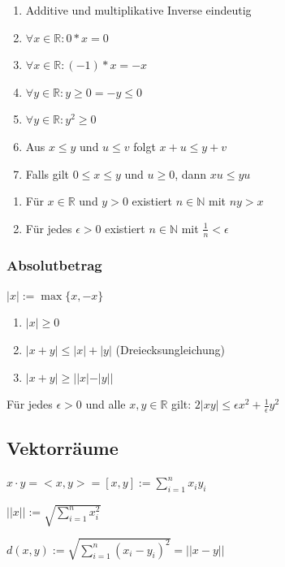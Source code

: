 \begin{enumerate}
    \item Additive und multiplikative Inverse eindeutig
    \item $\forall x \in \mathbb{R} : 0 * x = 0$
    \item $\forall x \in \mathbb{R} : (-1) * x = -x$
    \item $\forall y \in \mathbb{R} : y \geq 0 = -y \leq 0$
    \item $\forall y \in \mathbb{R} : y^2 \geq 0$
    \item Aus $x \leq y$ und $u \leq v$ folgt $x + u \leq y + v$
    \item Falls gilt $0 \leq x \leq y$ und $u \geq 0$, dann $xu \leq yu$
\end{enumerate}

\begin{enumerate}
    \item Für $x \in \mathbb{R}$ und $y > 0$ existiert $n \in \mathbb{N}$ mit $ny > x$
    \item Für jedes $\epsilon > 0$ existiert $n \in \mathbb{N}$ mit $\frac{1}{n} < \epsilon$
\end{enumerate}

\subsubsection{Absolutbetrag}
$|x| := \max\{x, -x\}$

\begin{enumerate}
    \item $|x| \geq 0$
    \item $|x+y| \leq |x| + |y|$ (Dreiecksungleichung)
    \item $|x + y| \geq ||x|-|y||$
\end{enumerate}

 Für jedes $\epsilon > 0$ und alle $x, y \in \mathbb{R}$ gilt: $2|xy| \leq \epsilon x^2 + \frac{1}{\epsilon}y^2$

\subsection{Vektorräume}

 $x \cdot y = <x, y> = [x,y] := \sum_{i=1}^{n}x_iy_i$

 $||x|| := \sqrt{\sum_{i=1}^{n} x_i^2}$

 $d(x,y):=\sqrt{\sum_{i=1}^{n}(x_i - y_i)^2}=||x-y||$

